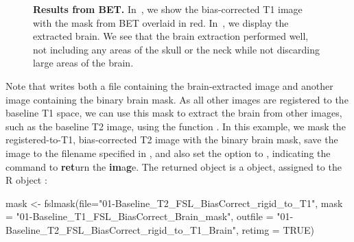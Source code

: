 \begin{figure}
\hfill
\caption{{\bf Results from BET.} In~\protect{}, we show the bias-corrected T1 image with the mask from BET overlaid in red.  In~\protect{}, we display the extracted brain.  We see that the brain extraction performed well, not including any areas of the skull or the neck while not discarding large areas of the brain.}
\label{fig:bet}
\end{figure}

Note that  writes both a file containing the brain-extracted image and another image containing the binary brain mask.  As all other images are registered to the baseline T1 space, we can use this mask to extract the brain from other images, such as the baseline T2 image, using the  function .  In this example, we mask the registered-to-T1, bias-corrected T2 image with the binary brain mask, save the image to the filename specified in , and also set the  option to , indicating the  command to {\bf ret}urn the {\bf im}a\textbf{g}e.  The returned object is a  object, assigned to the R object :
\begin{Schunk}
\begin{Sinput}
mask <- fslmask(file="01-Baseline_T2_FSL_BiasCorrect_rigid_to_T1", 
                mask = "01-Baseline_T1_FSL_BiasCorrect_Brain_mask",
                outfile = "01-Baseline_T2_FSL_BiasCorrect_rigid_to_T1_Brain", 
                retimg = TRUE)
\end{Sinput}
\end{Schunk}
\gobblepars


